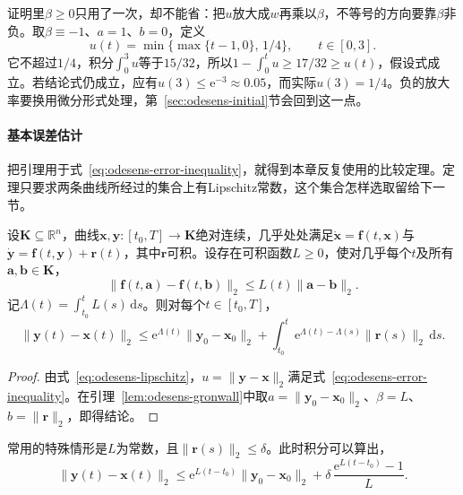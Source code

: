 证明里$\beta\geq0$只用了一次，却不能省：把$u$放大成$w$再乘以$\beta$，不等号的方向要靠$\beta$非负。取$\beta\equiv-1$、$a=1$、$b=0$，定义
\[
 u(t)=\min\bigl\{\max\{t-1,0\},\,1/4\bigr\},\qquad t\in[0,3].
\]
它不超过$1/4$，积分$\int_0^3u$等于$15/32$，所以$1-\int_0^tu\geq17/32\geq u(t)$，假设式成立。若结论式仍成立，应有$u(3)\leq\mathrm{e}^{-3}\approx0.05$，而实际$u(3)=1/4$。负的放大率要换用微分形式处理，第~\ref{sec:odesens-initial}节会回到这一点。

\paragraph{基本误差估计}
把引理用于式~\eqref{eq:odesens-error-inequality}，就得到本章反复使用的比较定理。定理只要求两条曲线所经过的集合上有Lipschitz常数，这个集合怎样选取留给下一节。

\begin{theorem}[基本误差估计]
\label{thm:odesens-basic-estimate}
设$\bm{K}\subseteq\mathbb{R}^{n}$，曲线$\bm{x},\bm{y}:[t_0,T]\to\bm{K}$绝对连续，几乎处处满足$\dot{\bm{x}}=\bm{f}(t,\bm{x})$与$\dot{\bm{y}}=\bm{f}(t,\bm{y})+\bm{r}(t)$，其中$\bm{r}$可积。设存在可积函数$L\geq0$，使对几乎每个$t$及所有$\bm{a},\bm{b}\in\bm{K}$，
\begin{equation}
 \lVert\bm{f}(t,\bm{a})-\bm{f}(t,\bm{b})\rVert_2\leq L(t)\lVert\bm{a}-\bm{b}\rVert_2.
 \label{eq:odesens-lipschitz}
\end{equation}
记$\Lambda(t)=\int_{t_0}^{t}L(s)\,\mathrm{d}s$。则对每个$t\in[t_0,T]$，
\begin{equation}
 \lVert\bm{y}(t)-\bm{x}(t)\rVert_2\leq\mathrm{e}^{\Lambda(t)}\lVert\bm{y}_0-\bm{x}_0\rVert_2+\int_{t_0}^{t}\mathrm{e}^{\Lambda(t)-\Lambda(s)}\lVert\bm{r}(s)\rVert_2\,\mathrm{d}s.
 \label{eq:odesens-basic-estimate}
\end{equation}
\end{theorem}

\begin{proof}
由式~\eqref{eq:odesens-lipschitz}，$u=\lVert\bm{y}-\bm{x}\rVert_2$满足式~\eqref{eq:odesens-error-inequality}。在引理~\ref{lem:odesens-gronwall}中取$a=\lVert\bm{y}_0-\bm{x}_0\rVert_2$、$\beta=L$、$b=\lVert\bm{r}\rVert_2$，即得结论。
\end{proof}

常用的特殊情形是$L$为常数，且$\lVert\bm{r}(s)\rVert_2\leq\delta$。此时积分可以算出，
\begin{equation}
 \lVert\bm{y}(t)-\bm{x}(t)\rVert_2\leq\mathrm{e}^{L(t-t_0)}\lVert\bm{y}_0-\bm{x}_0\rVert_2+\delta\,\frac{\mathrm{e}^{L(t-t_0)}-1}{L}.
 \label{eq:odesens-constant-estimate}
\end{equation}

